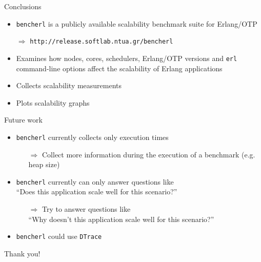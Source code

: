 \documentclass{beamer}
\begin{document}
\begin{frame}[t]{Conclusions}
	\begin{itemize}
		\item \texttt{bencherl} is a publicly available \textcolor{burgundy}{scalability} benchmark suite for Erlang/OTP
                  \par\medskip
		  $\Rightarrow$ \texttt{http://release.softlab.ntua.gr/bencherl}
                  \par\medskip
		\item Examines how \textcolor{burgundy}{nodes}, \textcolor{burgundy}{cores}, \textcolor{burgundy}{schedulers}, \textcolor{burgundy}{Erlang/OTP versions} and \textcolor{burgundy}{\texttt{erl} command-line options} affect the scalability of Erlang applications
		\item Collects \textcolor{burgundy}{scalability measurements}
		\item Plots \textcolor{burgundy}{scalability graphs}
	\end{itemize}
\end{frame}

\begin{frame}[t]{Future work}
  \begin{itemize}
  \item \texttt{bencherl} currently collects only execution times
    \begin{itemize}
    \item[$\Rightarrow$] Collect \textcolor{burgundy}{more information} during the execution of a benchmark (e.g. heap size)
    \end{itemize}
  \item \texttt{bencherl} currently can only answer questions like \\
    ``Does this application scale well for this scenario?''
    \begin{itemize}
    \item[$\Rightarrow$] Try to answer questions like \\
      ``\textcolor{burgundy}{Why} doesn't this application scale well for this scenario?''
    \end{itemize}
  \item \texttt{bencherl} could use \textcolor{burgundy}{\texttt{DTrace}}
  \end{itemize}
\end{frame}

\begin{frame}
	\vspace{50pt}
	\begin{center}
	Thank you!
	\end{center}
\end{frame}
\end{document}
